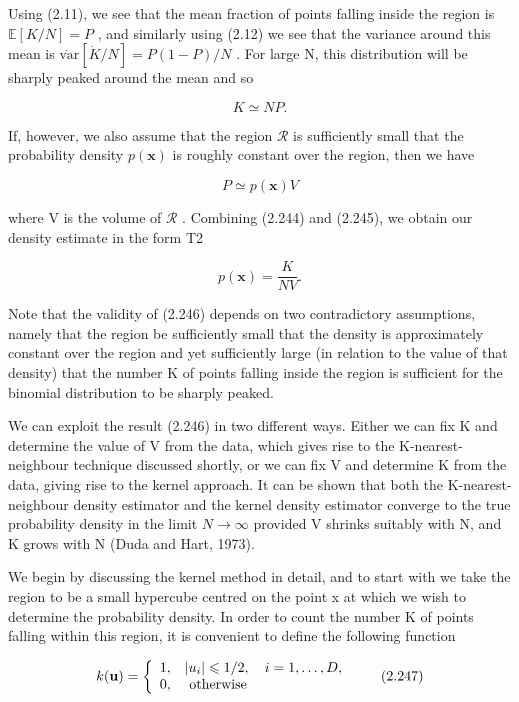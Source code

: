 \documentclass[
  10
]{article}
\begin{document}
Using (2.11), we see that the mean fraction of points falling inside the
region is \(\mathbb { E } [ K / N ] = P\) , and similarly using (2.12)
we see that the variance around this mean is
\(\mathrm { \dot { v a r } } [ \dot { K } / N ] = P ( 1 - P ) / N\) .
For large N, this distribution will be sharply peaked around the mean
and so

\[
K \simeq N P.\tag{2.244}
\]

If, however, we also assume that the region \(\mathcal { R }\) is
sufficiently small that the probability density \(p ( \mathbf { x } )\)
is roughly constant over the region, then we have

\[
P \simeq p (\mathbf {x}) V\tag{2.245}
\]

where V is the volume of \(\mathcal { R }\) . Combining (2.244) and
(2.245), we obtain our density estimate in the form T2

\[
p (\mathbf {x}) = \frac {K}{N V}.\tag{2.246}
\]

Note that the validity of (2.246) depends on two contradictory
assumptions, namely that the region be sufficiently small that the
density is approximately constant over the region and yet sufficiently
large (in relation to the value of that density) that the number K of
points falling inside the region is sufficient for the binomial
distribution to be sharply peaked.

We can exploit the result (2.246) in two different ways. Either we can
fix K and determine the value of V from the data, which gives rise to
the K-nearest-neighbour technique discussed shortly, or we can fix V and
determine K from the data, giving rise to the kernel approach. It can be
shown that both the K-nearest-neighbour density estimator and the kernel
density estimator converge to the true probability density in the limit
\(N \to \infty\) provided V shrinks suitably with N, and K grows with N
(Duda and Hart, 1973).

We begin by discussing the kernel method in detail, and to start with we
take the region to be a small hypercube centred on the point x at which
we wish to determine the probability density. In order to count the
number K of points falling within this region, it is convenient to
define the following function

\[
k (\mathbf {u}) = \left\{ \begin{array}{l l} 1, & | u _ {i} | \leqslant 1 / 2, \quad i = 1, \ldots , D, \\ 0, & \text { otherwise } \end{array} \right.\tag{2.247}
\]
\end{document}
